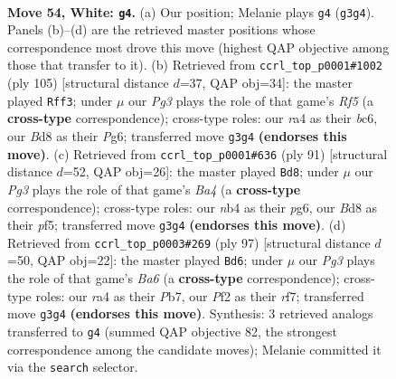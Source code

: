 \documentclass[11pt]{article}
\begin{document}
\clearpage

\begin{figure}[p]\centering
\begin{subfigure}{0.46\textwidth}\centering
\resizebox{\linewidth}{!}{%
\newchessgame
\chessboard[
  setfen={1R1B4/3b1k2/2r5/1p6/rn6/4P1Pp/1R3P2/7K w - - 2 54},
  showmover=false,
  pgfstyle=straightmove, color=movearrow, markmove={g3-g4}
]}
\caption{}
\end{subfigure}\hfill
\begin{subfigure}{0.46\textwidth}\centering
\resizebox{\linewidth}{!}{%
\newchessgame
\chessboard[
  setfen={8/P3k3/2Bp2p1/1NpP2P1/4br2/1r6/4K3/4R3 b - - 2 53},
  showmover=false,
  pgfstyle=straightmove, color=movearrow, markmove={f4-f3}
]}
\caption{}
\end{subfigure}
\\[4pt]
\begin{subfigure}{0.46\textwidth}\centering
\resizebox{\linewidth}{!}{%
\newchessgame
\chessboard[
  setfen={1k6/1p4r1/p2P2P1/b4P1p/8/B7/2r3BK/5R2 b - - 0 46},
  showmover=false,
  pgfstyle=straightmove, color=movearrow, markmove={a5-d8}
]}
\caption{}
\end{subfigure}\hfill
\begin{subfigure}{0.46\textwidth}\centering
\resizebox{\linewidth}{!}{%
\newchessgame
\chessboard[
  setfen={1k1r4/1p3R2/2p1B3/p3N3/3P4/b2K4/8/8 b - - 1 49},
  showmover=false,
  pgfstyle=straightmove, color=movearrow, markmove={a3-d6}
]}
\caption{}
\end{subfigure}
\caption{\textbf{Move 54, White: \texttt{g4}.} (a) Our position; Melanie plays \texttt{g4} (\texttt{g3g4}). Panels (b)--(d) are the retrieved master positions whose correspondence most drove this move (highest QAP objective among those that transfer to it). (b) Retrieved from \texttt{ccrl\_top\_p0001\#1002} (ply 105) [structural distance $d$=37, QAP obj=34]: the master played \texttt{Rff3}; under $\mu$ our \emph{Pg3} plays the role of that game's \emph{Rf5} (a \textbf{cross-type} correspondence); cross-type roles: our \emph{r}a4 as their \emph{b}c6, our \emph{B}d8 as their \emph{P}g6; transferred move \texttt{g3g4} \textbf{(endorses this move)}. (c) Retrieved from \texttt{ccrl\_top\_p0001\#636} (ply 91) [structural distance $d$=52, QAP obj=26]: the master played \texttt{Bd8}; under $\mu$ our \emph{Pg3} plays the role of that game's \emph{Ba4} (a \textbf{cross-type} correspondence); cross-type roles: our \emph{n}b4 as their \emph{p}g6, our \emph{B}d8 as their \emph{p}f5; transferred move \texttt{g3g4} \textbf{(endorses this move)}. (d) Retrieved from \texttt{ccrl\_top\_p0003\#269} (ply 97) [structural distance $d$=50, QAP obj=22]: the master played \texttt{Bd6}; under $\mu$ our \emph{Pg3} plays the role of that game's \emph{Ba6} (a \textbf{cross-type} correspondence); cross-type roles: our \emph{r}a4 as their \emph{P}b7, our \emph{P}f2 as their \emph{r}f7; transferred move \texttt{g3g4} \textbf{(endorses this move)}. Synthesis: 3 retrieved analogs transferred to \texttt{g4} (summed QAP objective 82, the strongest correspondence among the candidate moves); Melanie committed it via the \texttt{search} selector.}
\label{fig:thought-m106}
\end{figure}
\end{document}
